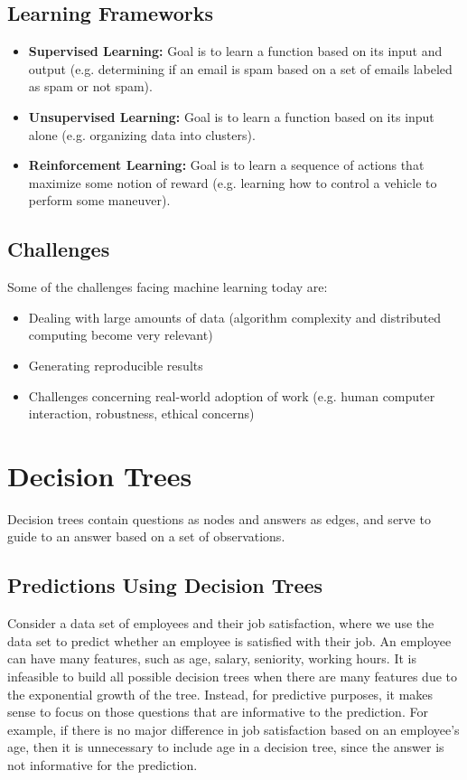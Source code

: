 \documentclass[12pt,titlepage]{article}
\let\stdsection\section
\renewcommand\section{\clearpage\stdsection}
\begin{document}
    \subsection{Learning Frameworks}
      \begin{itemize}
        \item \textbf{Supervised Learning:} Goal is to learn a function based on its input and output (e.g. determining if an email is spam
          based on a set of emails labeled as spam or not spam).
        \item \textbf{Unsupervised Learning:} Goal is to learn a function based on its input alone (e.g. organizing data into clusters).
        \item \textbf{Reinforcement Learning:} Goal is to learn a sequence of actions that maximize some notion of reward (e.g. learning how
          to control a vehicle to perform some maneuver).
      \end{itemize}

    \subsection{Challenges}
      Some of the challenges facing machine learning today are:
      \begin{itemize}
        \item Dealing with large amounts of data (algorithm complexity and distributed computing become very relevant)
        \item Generating reproducible results
        \item Challenges concerning real-world adoption of work (e.g. human computer interaction, robustness, ethical concerns)
      \end{itemize}

  \section{Decision Trees}
    Decision trees contain questions as nodes and answers as edges, and serve to guide to an answer based on a set of observations.

    \subsection{Predictions Using Decision Trees}
      Consider a data set of employees and their job satisfaction, where we use the data set to predict whether an employee is satisfied with their
      job. An employee can have many features, such as age, salary, seniority, working hours. It is infeasible to build all possible decision trees
      when there are many features due to the exponential growth of the tree. Instead, for predictive purposes, it makes sense to focus on those
      questions that are informative to the prediction. For example, if there is no major difference in job satisfaction based on an employee's age,
      then it is unnecessary to include age in a decision tree, since the answer is not informative for the prediction.
\end{document}
